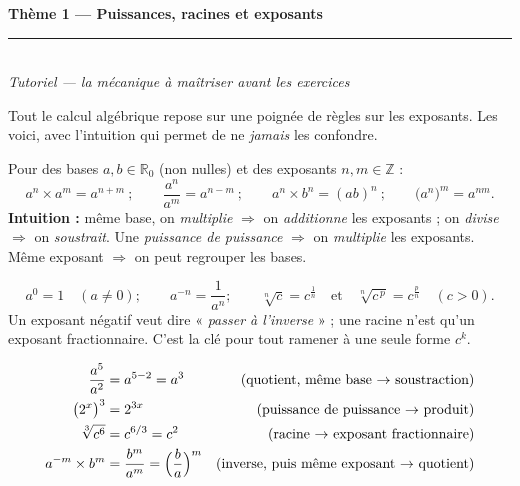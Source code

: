\documentclass[11pt,a4paper]{article}
\newcommand{\R}{\mathbb{R}}
\newcommand{\Z}{\mathbb{Z}}
\begin{document}
\begin{center}
{\LARGE\bfseries\color{primarydark} Thème 1 — Puissances, racines et exposants}\\[2pt]
{\color{primary}\rule{0.5\textwidth}{1.2pt}}\\[4pt]
{\small\itshape Tutoriel — la mécanique à maîtriser avant les exercices}
\end{center}

\vspace{2mm}
\noindent Tout le calcul algébrique repose sur une poignée de règles sur les exposants. Les voici,
avec l'intuition qui permet de ne \emph{jamais} les confondre.

\begin{cle}
Pour des bases $a,b\in\R_0$ (non nulles) et des exposants $n,m\in\Z$ :
\[ a^{n}\times a^{m}=a^{n+m}\ ;\qquad \frac{a^{n}}{a^{m}}=a^{n-m}\ ;\qquad
   a^{n}\times b^{n}=(ab)^{n}\ ;\qquad \bigl(a^{n}\bigr)^{m}=a^{nm}. \]
\textbf{Intuition :} même base, on \emph{multiplie} $\Rightarrow$ on \emph{additionne} les exposants ;
on \emph{divise} $\Rightarrow$ on \emph{soustrait}. Une \emph{puissance de puissance} $\Rightarrow$ on
\emph{multiplie} les exposants. Même exposant $\Rightarrow$ on peut regrouper les bases.
\end{cle}

\begin{cle}
\[ a^{0}=1\quad(a\neq 0);\qquad a^{-n}=\frac{1}{a^{n}};\qquad
   \sqrt[n]{c}=c^{\frac1n}\quad\text{et}\quad \sqrt[n]{c^{\,p}}=c^{\frac pn}\quad(c>0). \]
Un exposant négatif veut dire « \emph{passer à l'inverse} » ; une racine n'est qu'un exposant
fractionnaire. C'est la clé pour tout ramener à une seule forme $c^{k}$.
\end{cle}

\begin{exemplebox}
\begin{align*}
 \frac{a^{5}}{a^{2}}&=a^{5-2}=a^{3}
   &\text{(quotient, même base $\to$ soustraction)}\\
 \bigl(2^{x}\bigr)^{3}&=2^{3x}
   &\text{(puissance de puissance $\to$ produit)}\\
 \sqrt[3]{c^{6}}&=c^{6/3}=c^{2}
   &\text{(racine $\to$ exposant fractionnaire)}\\
 a^{-m}\times b^{m}&=\frac{b^{m}}{a^{m}}=\Bigl(\frac{b}{a}\Bigr)^{m}
   &\text{(inverse, puis même exposant $\to$ quotient)}
\end{align*}
\end{exemplebox}
\end{document}
